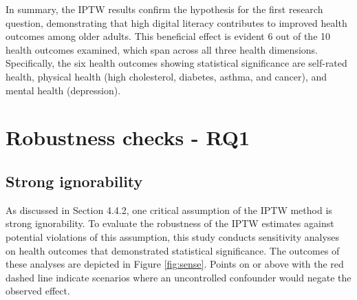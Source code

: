 In summary, the IPTW results confirm the hypothesis for the first research question, demonstrating that high digital literacy contributes to improved health outcomes among older adults. This beneficial effect is evident 6 out of the 10 health outcomes examined, which span across all three health dimensions. Specifically, the six health outcomes showing statistical significance are self-rated health, physical health (high cholesterol, diabetes, asthma, and cancer), and mental health (depression).

\section{Robustness checks - RQ1}

\subsection{Strong ignorability}
As discussed in Section 4.4.2, one critical assumption of the IPTW method is strong ignorability. To evaluate the robustness of the IPTW estimates against potential violations of this assumption, this study conducts sensitivity analyses on health outcomes that demonstrated statistical significance. The outcomes of these analyses are depicted in Figure \ref{fig:sense}. Points on or above with the red dashed line indicate scenarios where an uncontrolled confounder would negate the observed effect.


